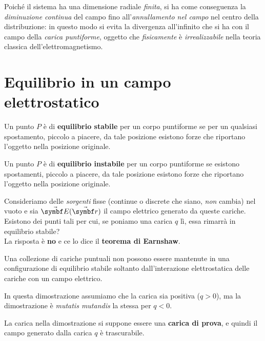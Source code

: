 \begin{observe}
	Poiché il sistema ha una dimensione radiale \textit{finita}, si ha come conseguenza la \textit{diminuzione continua} del campo fino all'\textit{annullamento nel campo} nel centro della distribuzione: in questo modo si evita la divergenza all'infinito che si ha con il campo della \textit{carica puntiforme}, oggetto che \textit{fisicamente} è \textit{irrealizzabile} nella teoria classica dell'elettromagnetismo.
\end{observe}
\section{Equilibrio in un campo elettrostatico}
\begin{define}
	Un punto $P$ è di \textbf{equilibrio stabile} per un corpo puntiforme se per un qualsiasi spostamento, piccolo a piacere, da tale posizione esistono forze che riportano l'oggetto nella posizione originale.
\end{define}
\begin{define}
	Un punto $P$ è di \textbf{equilibrio instabile} per un corpo puntiforme se esistono spostamenti, piccolo a piacere, da tale posizione esistono forze che riportano l'oggetto nella posizione originale.
\end{define}
Consideriamo delle \textit{sorgenti} fisse (continue o discrete che siano, \textit{non} cambia) nel vuoto e sia $\vba{E}(\vba{r})$ il campo elettrico generato da queste cariche. Esistono dei punti tali per cui, se poniamo una carica $q$ lì, essa rimarrà in equilibrio stabile?\\
La risposta è \textbf{no} e ce lo dice il \textbf{teorema di Earnshaw}.
\begin{theorema}
	Una collezione di cariche puntuali non possono essere mantenute in una configurazione di equilibrio stabile soltanto dall'interazione elettrostatica delle cariche con un campo elettrico.
\end{theorema}
In questa dimostrazione assumiamo che la carica sia positiva ($q>0$), ma la dimostrazione è \textit{mutatis mutandis} la stessa per $q<0$.
\begin{observe}
	La carica nella dimostrazione si suppone essere una \textbf{carica di prova}, e quindi il campo generato dalla carica $q$ è trascurabile.
\end{observe}
